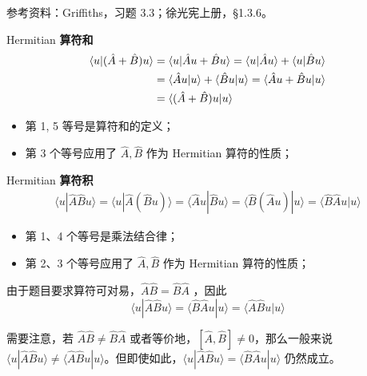 参考资料：Griffiths，习题 3.3；徐光宪上册，\S 1.3.6。

Hermitian \textbf{算符和}
  \begin{align}
    \langle u | (\hat A + \hat B) u \rangle
    &= \langle u | \hat A u + \hat B u \rangle = \langle u | \hat A u \rangle + \langle u | \hat B u \rangle \notag\\
    &= \langle \hat A u | u \rangle + \langle \hat B u | u \rangle = \langle \hat A u + \hat B u | u \rangle \notag\\
    &= \langle (\hat A + \hat B) u | u \rangle
  \end{align}
  \begin{itemize}[nosep]
    \item 第 1, 5 等号是算符和的定义；
    \item 第 3 个等号应用了 $\hat A, \hat B$ 作为 Hermitian 算符的性质；
  \end{itemize}

Hermitian \textbf{算符积}
  \begin{align}
    \langle u | \hat A \hat B u \rangle = \langle u | \hat A (\hat B u) \rangle = \langle \hat A u | \hat B u \rangle = \langle \hat B (\hat A u) | u \rangle = \langle \hat B \hat A u | u \rangle
  \end{align}
  \begin{itemize}[nosep]
    \item 第 1、4 个等号是乘法结合律；
    \item 第 2、3 个等号应用了 $\hat A, \hat B$ 作为 Hermitian 算符的性质；
  \end{itemize}
  由于题目要求算符可对易，$\hat A \hat B = \hat B \hat A$ ，因此
  \begin{equation}
    \langle u | \hat A \hat B u \rangle = \langle \hat B \hat A u | u \rangle = \langle \hat A \hat B u | u \rangle
  \end{equation}

需要注意，若 $\hat A \hat B \neq \hat B \hat A$ 或者等价地，$[\hat A, \hat B] \neq 0$，那么一般来说 $\langle u | \hat A \hat B u \rangle \neq \langle \hat A \hat B u | u \rangle$。但即使如此，$\langle u | \hat A \hat B u \rangle = \langle \hat B \hat A u | u \rangle$ 仍然成立。

